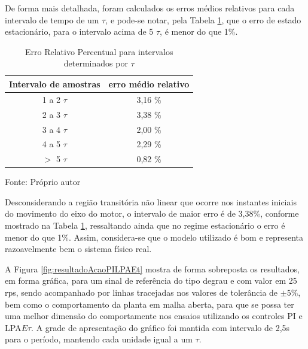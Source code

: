 De forma mais detalhada, 
foram calculados os erros médios relativos para cada intervalo de 
tempo de um $\tau$, 
e pode-se notar, 
pela Tabela \ref{tab:resultadoErroModeloTau}, 
que o erro de estado estacionário, para o intervalo acima de 5 $\tau$, é menor do que 1\%. 


\begin{table}[h]
\centering
\caption{Erro Relativo Percentual para intervalos determinados por $\tau$ }
\label{tab:resultadoErroModeloTau}

\begin{tabular}{c|c}
\hline
Intervalo de amostras  &  erro médio relativo \\ \hline
\hline
1 a 2 $\tau$ &  3,16 \% \\ \hline
2 a 3 $\tau$ &  3,38 \% \\ \hline
3 a 4 $\tau$ &  2,00 \% \\ \hline
4 a 5 $\tau$ &  2,29 \% \\ \hline
$>$ 5 $\tau$ &  0,82 \% \\ \hline
\end{tabular}

{\vspace{0.2cm} \small Fonte: Próprio autor}
\end{table}

Desconsiderando a região transitória não linear 
que ocorre nos instantes iniciais do movimento do eixo do motor, 
o intervalo de maior erro é de 3,38\%, 
conforme mostrado na Tabela \ref{tab:resultadoErroModeloTau},
ressaltando ainda que no regime estacionário 
o erro é menor do que 1\%.
Assim, considera-se que o modelo utilizado é bom e representa razoavelmente bem o sistema físico real.

A Figura \ref{fig:resultadoAcaoPILPAEt} mostra de forma sobreposta os
resultados, em forma gráfica, para um sinal de referência do tipo
degrau e com valor em 25 rps, sendo acompanhado por linhas tracejadas
nos valores de tolerância de  $\pm 5\%$, bem como o comportamento da
planta em malha aberta, para que se possa ter uma melhor dimensão
do comportamente nos ensaios utilizando os controles PI e LPA$E\tau$.
A grade de apresentação do gráfico foi mantida com intervalo de 2,5s para o
período, mantendo cada unidade igual a um $\tau$. 





